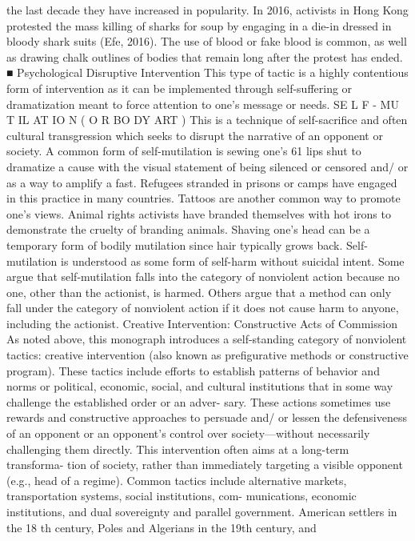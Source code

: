 \documentclass[twoside,a4paper,12pt,fleqn,openany]{extbook}
\begin{document}
the last decade they have increased in popularity. In 2016, activists in Hong Kong protested
the mass killing of sharks for soup by engaging in a die-in dressed in bloody shark suits (Efe,
2016). The use of blood or fake blood is common, as well as drawing chalk outlines of bodies
that remain long after the protest has ended.
■ Psychological Disruptive Intervention
This type of tactic is a highly contentious form of intervention as it can be implemented through
self-suffering or dramatization meant to force attention to one’s message or needs.
SE L F - MU T IL AT IO N ( O R BO DY ART )
This is a technique of self-sacrifice and often cultural transgression which seeks to disrupt
the narrative of an opponent or society. A common form of self-mutilation is sewing one’s
61
lips shut to dramatize a cause with the visual statement of being silenced or censored and/
or as a way to amplify a fast. Refugees stranded in prisons or camps have engaged in this
practice in many countries. Tattoos are another common way to promote one’s views. Animal
rights activists have branded themselves with hot irons to demonstrate the cruelty of branding
animals. Shaving one’s head can be a temporary form of bodily mutilation since hair typically
grows back.
Self-mutilation is understood as some form of self-harm without suicidal intent. Some
argue that self-mutilation falls into the category of nonviolent action because no one, other
than the actionist, is harmed. Others argue that a method can only fall under the category of
nonviolent action if it does not cause harm to anyone, including the actionist.
Creative Intervention: Constructive Acts of Commission
As noted above, this monograph introduces a self-standing category of nonviolent tactics:
creative intervention (also known as prefigurative methods or constructive program). These
tactics include efforts to establish patterns of behavior and norms or political, economic,
social, and cultural institutions that in some way challenge the established order or an adver-
sary. These actions sometimes use rewards and constructive approaches to persuade and/
or lessen the defensiveness of an opponent or an opponent’s control over society—without
necessarily challenging them directly. This intervention often aims at a long-term transforma-
tion of society, rather than immediately targeting a visible opponent (e.g., head of a regime).
Common tactics include alternative markets, transportation systems, social institutions, com-
munications, economic institutions, and dual sovereignty and parallel government.
American settlers in the 18 th century, Poles and Algerians in the 19th century, and
\end{document}
